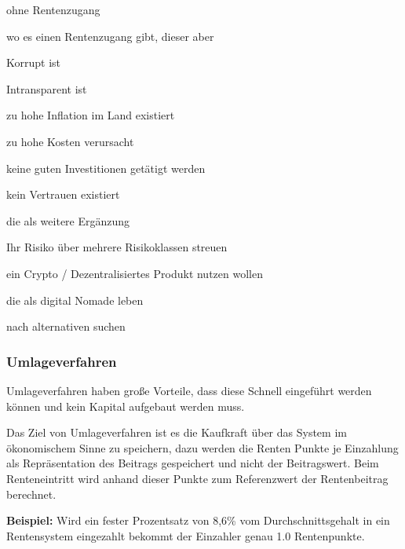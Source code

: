\begin{compactitem}
\item ohne Rentenzugang
\item wo es einen Rentenzugang gibt, dieser aber 
 \begin{compactitem}
 \item Korrupt ist
 \item Intransparent ist
 \item zu hohe Inflation im Land existiert
 \item zu hohe Kosten verursacht
 \item keine guten Investitionen getätigt werden
 \item kein Vertrauen existiert
 \end{compactitem}
\item die als weitere Ergänzung 
 \begin{compactitem}
 \item Ihr Risiko über mehrere Risikoklassen streuen
 \item ein Crypto / Dezentralisiertes Produkt nutzen wollen
 \item die als digital Nomade leben
 \item nach alternativen suchen
 \end{compactitem}
\end{compactitem}

\subsubsection*{Umlageverfahren}


Umlageverfahren haben große Vorteile, dass diese Schnell eingeführt werden können und kein Kapital aufgebaut werden muss.

Das Ziel von Umlageverfahren ist es die Kaufkraft über das System im ökonomischem Sinne zu speichern, dazu werden die Renten Punkte je Einzahlung als Repräsentation des Beitrags gespeichert und nicht der Beitragswert.
Beim Renteneintritt wird anhand dieser Punkte zum Referenzwert der Rentenbeitrag berechnet. 

\textbf{Beispiel:} Wird ein fester Prozentsatz von 8,6\% vom Durchschnittsgehalt in ein Rentensystem eingezahlt bekommt der Einzahler genau 1.0 Rentenpunkte.


